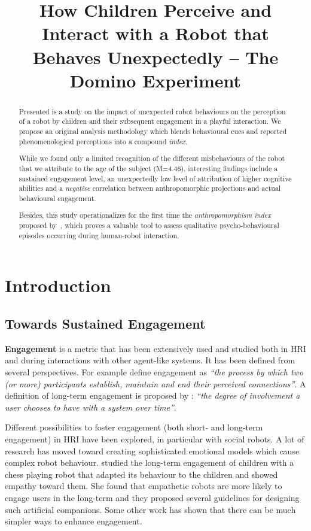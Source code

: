 \documentclass{sig-alternate}
\title{\LARGE \bf
How Children Perceive and Interact with a Robot that Behaves Unexpectedly -- The Domino Experiment
}
\begin{document}
\maketitle
\begin{abstract}

Presented is a study on the impact of unexpected robot behaviours on the
perception of a robot by children and their subsequent engagement in a playful interaction.
We propose an original analysis methodology which blends behavioural cues and
reported phenomenological perceptions into a compound \emph{index}.

While we found only a limited recognition of the different misbehaviours of the
robot that we attribute to the age of the subject (M=4.46), interesting findings
include a sustained engagement level, an unexpectedly low level of attribution
of higher cognitive abilities and a \emph{negative} correlation between
anthropomorphic projections and actual behavioural engagement.

Besides, this study operationalizes for the first time the
\emph{anthropomorphism index} proposed by~\cite{fink2014dynamics}, which proves a
valuable tool to assess qualitative psycho-behavioural episodes occurring during
human-robot interaction.

\end{abstract}
\section{Introduction}
\subsection{Towards Sustained Engagement}

\textbf{Engagement} is a metric that has been extensively used and studied both
in HRI and during interactions with other agent-like systems. It has been
defined from several perspectives. For example \cite{sidner_where_2004} define
engagement as \textit{``the process by which two (or more) participants
establish, maintain and end their perceived connections''}. A definition of
long-term engagement is proposed by \cite{bickmore_maintaining_2010}:
\textit{``the degree of involvement a user chooses to have with a system over
time''}.

Different possibilities to foster engagement (both short- and long-term
engagement) in HRI have been explored, in particular with social robots. A lot
of research has moved toward creating sophisticated emotional models which cause
complex robot behaviour. \cite{leite_long-term_2013} studied the long-term
engagement of children with a chess playing robot that adapted its behaviour to
the children and showed empathy toward them. She found that empathetic robots
are more likely to engage users in the long-term and they proposed several
guidelines for designing such artificial companions. Some other work
\cite{bickmore_maintaining_2010,short_no_2010} has shown that there can be much
simpler ways to enhance engagement. 
\end{document}
